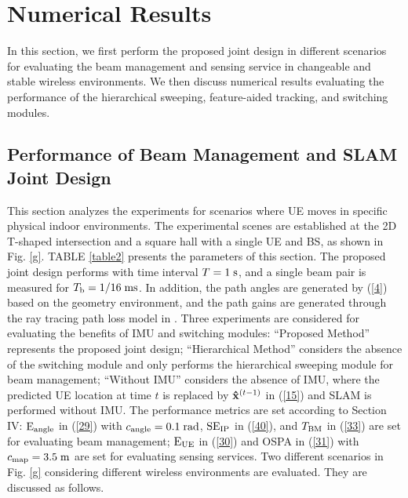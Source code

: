 \documentclass[journal,12pt,onecolumn,draftclsnofoot,]{IEEEtran}
\begin{document}
\vspace{-3.5mm}
\section{Numerical Results}
In this section, we first perform the proposed joint design in different scenarios for evaluating the beam management and sensing service in changeable and stable wireless environments. 
We then discuss numerical results evaluating the performance of the hierarchical sweeping, feature-aided tracking, and switching modules. 
\vspace{-5mm}
\subsection{Performance of Beam Management and SLAM Joint Design}
\vspace{-1.5mm}
This section analyzes the experiments for scenarios where UE moves in specific physical indoor environments. 
The experimental scenes are established at the 2D T-shaped intersection and a square hall with a single UE and BS, as shown in Fig. \ref{g}. 
TABLE \ref{table2} presents the parameters of this section. 
The proposed joint design performs with time interval $T=1{\;\rm s}$, and a single beam pair is measured for ${{{T}}_{\rm{b}}} = {1}/{{16}}\;{\rm{ms}}$.
In addition, the path angles are generated by (\ref{4}) based on the geometry environment, and the path gains are generated through the ray tracing path loss model in \cite{a18}. 
Three experiments are considered for evaluating the benefits of IMU and switching modules:
``Proposed Method'' represents the proposed joint design;
``Hierarchical Method'' considers the absence of the switching module and only performs the hierarchical sweeping module for beam management; 
``Without IMU'' considers the absence of IMU, where the predicted UE location at time $t$ is replaced by ${{\bf{\hat x}}^{({t - 1} )}}$ in (\ref{15}) and SLAM is performed without IMU. 
The performance metrics are set according to Section IV: ${{\rm{E}}_{{\rm{angle}}}}$ in (\ref{29}) with $c_{\rm angle}=0.1\;{\rm rad}$, ${\rm{S}}{{\rm{E}}_{{\rm{IP}}}}$ in (\ref{40}), and ${{{T}}_{{\rm{BM}}}}$ in (\ref{33}) are set for evaluating beam management; ${{\rm{E}}_{{\rm{UE}}}}$ in (\ref{30}) and OSPA in (\ref{31}) with $c_{\rm map}=3.5\;{\rm m}$ are set for evaluating sensing services. 
Two different scenarios in Fig. \ref{g} considering different wireless environments are evaluated. They are discussed as follows.
\end{document}
